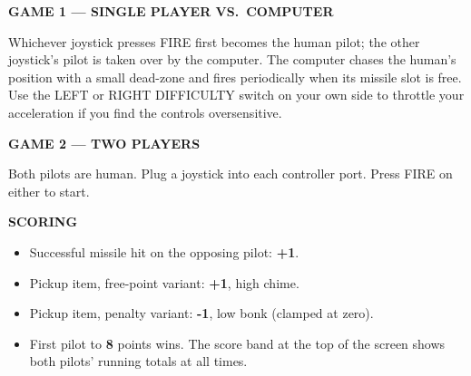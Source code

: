 \documentclass[10pt]{article}
\newcommand{\sectionrule}[1]{%
  \par\vspace{6pt}%
  \noindent\colorbox{atariOrange}{\parbox{\dimexpr\linewidth-2\fboxsep\relax}{\strut\textcolor{atariCream}{\textbf{\textsf{\MakeUppercase{#1}}}}\hfill}}%
  \par\vspace{4pt}%
}
\newcommand{\subhead}[1]{%
  \par\vspace{4pt}%
  \noindent\textbf{\textsf{\MakeUppercase{#1}}}\par\vspace{2pt}%
}
\begin{document}
\begin{center}
\end{center}

\subhead{Game 1 --- Single Player vs.\ Computer}
Whichever joystick presses FIRE first becomes the human pilot; the other
joystick's pilot is taken over by the computer. The computer chases the
human's position with a small dead-zone and fires periodically when its
missile slot is free. Use the LEFT or RIGHT DIFFICULTY switch on your
own side to throttle your acceleration if you find the controls
oversensitive.

\subhead{Game 2 --- Two Players}
Both pilots are human. Plug a joystick into each controller port. Press
FIRE on either to start.

\sectionrule{Scoring}
\begin{itemize}\itemsep0pt
\item Successful missile hit on the opposing pilot: {\bfseries +1}.
\item Pickup item, free-point variant: {\bfseries +1}, high chime.
\item Pickup item, penalty variant: {\bfseries -1}, low bonk
      (clamped at zero).
\item First pilot to {\bfseries 8} points wins. The score band at the
      top of the screen shows both pilots' running totals at all times.
\end{itemize}

\newpage
\end{document}
